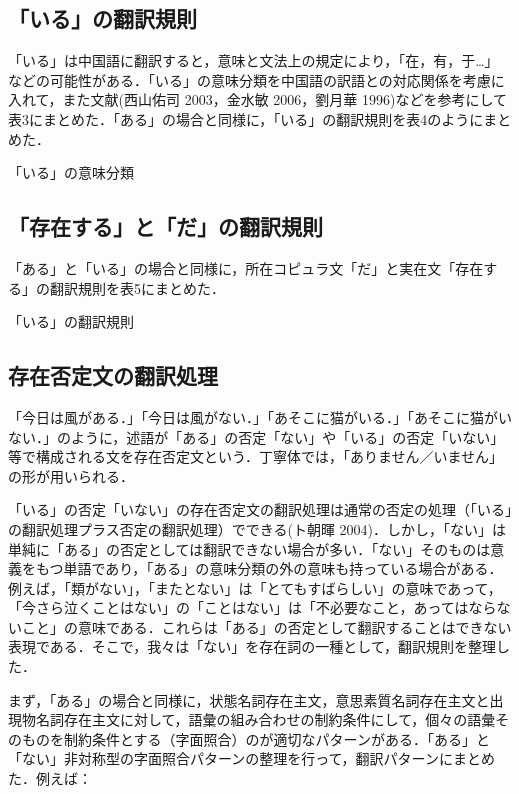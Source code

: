 \documentclass[japanese]{jnlp_1.4}
\begin{document}
\subsection{「いる」の翻訳規則}

「いる」は中国語に翻訳すると，意味と文法上の規定により，「在，有，于…」などの可能性がある．「いる」の意味分類を中国語の訳語との対応関係を考慮に入れて，また文献(西山佑司 2003，金水敏 2006，劉月華 1996)などを参考にして表3にまとめた．「ある」の場合と同様に，「いる」の翻訳規則を表4のようにまとめた．

\begin{table}[t]
\caption{「いる」の意味分類}

\end{table}



\subsection{「存在する」と「だ」の翻訳規則}

「ある」と「いる」の場合と同様に，所在コピュラ文「だ」と実在文「存在する」の翻訳規則を表5にまとめた．

\begin{table}[t]
\caption{「いる」の翻訳規則}

\end{table}


\subsection{存在否定文の翻訳処理}

「今日は風がある．」「今日は風がない．」「あそこに猫がいる．」「あそこに猫がいない．」のように，述語が「ある」の否定「ない」や「いる」の否定「いない」等で構成される文を存在否定文という．丁寧体では，「ありません／いません」の形が用いられる．

「いる」の否定「いない」の存在否定文の翻訳処理は通常の否定の処理（「いる」の翻訳処理プラス否定の翻訳処理）でできる(ト朝暉 2004)．しかし，「ない」は単純に「ある」の否定としては翻訳できない場合が多い．「ない」そのものは意義をもつ単語であり，「ある」の意味分類の外の意味も持っている場合がある．例えば，「類がない」，「またとない」は「とてもすばらしい」の意味であって，「今さら泣くことはない」の「ことはない」は「不必要なこと，あってはならないこと」の意味である．これらは「ある」の否定として翻訳することはできない表現である．そこで，我々は「ない」を存在詞の一種として，翻訳規則を整理した．

まず，「ある」の場合と同様に，状態名詞存在主文，意思素質名詞存在主文と出現物名詞存在主文に対して，語彙の組み合わせの制約条件にして，個々の語彙そのものを制約条件とする（字面照合）のが適切なパターンがある．「ある」と「ない」非対称型の字面照合パターンの整理を行って，翻訳パターンにまとめた．例えば：
\end{document}
